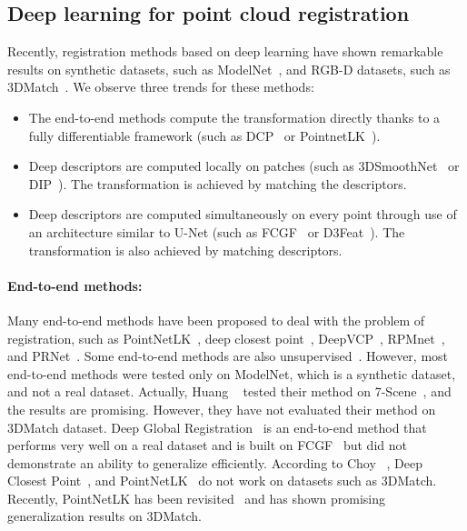 \documentclass[10pt,twocolumn,letterpaper]{article}
\begin{document}
\subsection{Deep learning for point cloud registration}
Recently, registration methods based on deep learning have shown remarkable results on synthetic datasets, such as ModelNet~\cite{Wu_2015_CVPR}, and RGB-D datasets, such as 3DMatch~\cite{zeng20163dmatch}. 
We observe three trends for these methods:
\begin{itemize}
    \item The end-to-end methods compute the transformation directly thanks to a fully differentiable framework (such as DCP~\cite{wang2019deep} or PointnetLK~\cite{aoki2019pointnetlk}).
    
    \item Deep descriptors are computed locally on patches (such as 3DSmoothNet~\cite{gojcic2018perfect} or  DIP~\cite{Poiesi2021}). The transformation is achieved by matching the descriptors.
    
    \item Deep descriptors are computed simultaneously on every point through use of an architecture similar to U-Net (such as FCGF~\cite{choy2019fully} or D3Feat~\cite{bai2020d3feat}). The transformation is also achieved by matching descriptors.
    
\end{itemize}

\paragraph{End-to-end methods:}
Many end-to-end methods have been proposed to deal with the problem of registration, such as PointNetLK~\cite{aoki2019pointnetlk}, deep closest point~\cite{wang2019deep}, DeepVCP~\cite{lu2019deepvcp}, RPMnet~\cite{yew2020rpmnet}, and PRNet~\cite{Wang_2019_NeurIPS}. Some end-to-end methods are also unsupervised~\cite{Wang_2019_NeurIPS, huang2020featuremetric}.  However, most end-to-end methods were tested only on ModelNet, which is a synthetic dataset, and not a real dataset. Actually, Huang \etal~\cite{huang2020featuremetric} tested their method on 7-Scene~\cite{shotton20137scene}, and the results are promising. However, they have not evaluated their method on 3DMatch dataset. 
Deep Global Registration~\cite{choy2020deep} is an end-to-end method that performs very well on a real dataset and is built on FCGF~\cite{choy2019fully} but did not demonstrate an ability to generalize efficiently. According to Choy \etal~\cite{choy2020deep}, Deep Closest Point~\cite{wang2019deep}, and PointNetLK~\cite{aoki2019pointnetlk} do not work on datasets such as 3DMatch.
Recently, PointNetLK has been revisited~\cite{Li_2021_CVPR} and has shown promising generalization results on 3DMatch.
\end{document}
